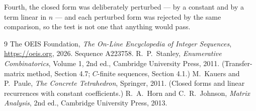 \documentclass[11pt,a4paper]{article}
\theoremstyle{plain}
\theoremstyle{definition}
\begin{document}
Fourth, the closed form was deliberately perturbed --- by a constant and by a term linear in
$n$ --- and each perturbed form was rejected by the same comparison, so the test is not one
that anything would pass.

\begin{thebibliography}{9}
 The OEIS Foundation, \emph{The On-Line Encyclopedia of Integer
Sequences}, \url{https://oeis.org}, 2026. Sequence A223758.
 R.~P.~Stanley, \emph{Enumerative Combinatorics}, Volume 1, 2nd ed.,
Cambridge University Press, 2011. (Transfer-matrix method, Section 4.7; $C$-finite sequences,
Section 4.1.)
 M.~Kauers and P.~Paule, \emph{The Concrete Tetrahedron}, Springer, 2011.
(Closed forms and linear recurrences with constant coefficients.)
 R.~A.~Horn and C.~R.~Johnson, \emph{Matrix Analysis}, 2nd ed., Cambridge
University Press, 2013.
\end{thebibliography}
\end{document}
